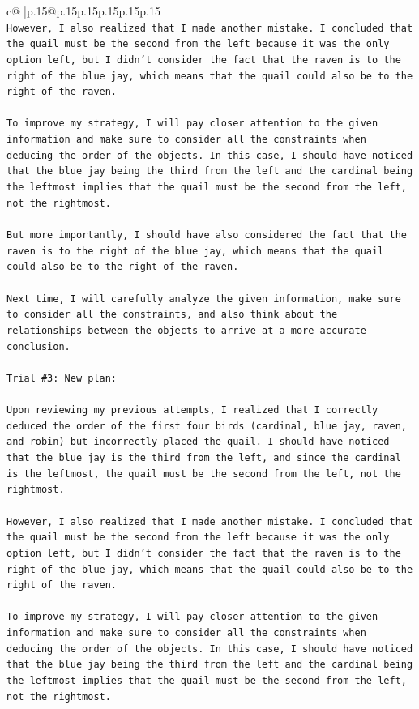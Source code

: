 \documentclass{article}
\begin{document}
{\begin{supertabular}{c@{$\;$}|p{.15\linewidth}@{}p{.15\linewidth}p{.15\linewidth}p{.15\linewidth}p{.15\linewidth}p{.15\linewidth}}
{{{\\ 
\texttt{However, I also realized that I made another mistake. I concluded that the quail must be the second from the left because it was the only option left, but I didn't consider the fact that the raven is to the right of the blue jay, which means that the quail could also be to the right of the raven. } \\
\\ 
\texttt{To improve my strategy, I will pay closer attention to the given information and make sure to consider all the constraints when deducing the order of the objects. In this case, I should have noticed that the blue jay being the third from the left and the cardinal being the leftmost implies that the quail must be the second from the left, not the rightmost. } \\
\\ 
\texttt{But more importantly, I should have also considered the fact that the raven is to the right of the blue jay, which means that the quail could also be to the right of the raven. } \\
\\ 
\texttt{Next time, I will carefully analyze the given information, make sure to consider all the constraints, and also think about the relationships between the objects to arrive at a more accurate conclusion.} \\
\\ 
\texttt{Trial \#3: New plan: } \\
\\ 
\texttt{Upon reviewing my previous attempts, I realized that I correctly deduced the order of the first four birds (cardinal, blue jay, raven, and robin) but incorrectly placed the quail. I should have noticed that the blue jay is the third from the left, and since the cardinal is the leftmost, the quail must be the second from the left, not the rightmost. } \\
\\ 
\texttt{However, I also realized that I made another mistake. I concluded that the quail must be the second from the left because it was the only option left, but I didn't consider the fact that the raven is to the right of the blue jay, which means that the quail could also be to the right of the raven. } \\
\\ 
\texttt{To improve my strategy, I will pay closer attention to the given information and make sure to consider all the constraints when deducing the order of the objects. In this case, I should have noticed that the blue jay being the third from the left and the cardinal being the leftmost implies that the quail must be the second from the left, not the rightmost. } \\
}}}
\end{supertabular}}
\end{document}
